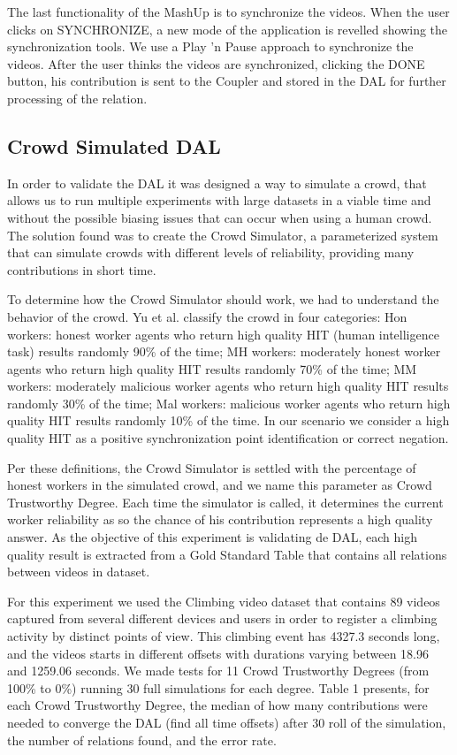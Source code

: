 \documentclass[sigconf]{acmart}
\begin{document}
The last functionality of the MashUp is to synchronize the videos. When the user clicks on SYNCHRONIZE, a new mode of the application is revelled showing the synchronization tools. We use a Play ’n Pause approach to synchronize the videos. After the user thinks the videos are synchronized, clicking the DONE button, his contribution is sent to the Coupler and stored in the DAL for further processing of the relation.

\subsection{Crowd Simulated DAL}
In order to validate the DAL it was designed a way to simulate a crowd, that allows us to run multiple experiments with large datasets in a viable time and without the possible biasing issues that can occur when using a human crowd. The solution found was to create the Crowd Simulator, a parameterized system that can simulate crowds with different levels of reliability, providing many contributions in short time.

To determine how the Crowd Simulator should work, we had to understand the behavior of the crowd. Yu et al.\cite{yu2012challenges} classify the crowd in four categories: Hon workers: honest worker agents who return high quality HIT (human intelligence task) results randomly 90\% of the time; MH workers: moderately honest worker agents who return high quality HIT results randomly 70\% of the time; MM workers: moderately malicious worker agents who return high quality HIT results randomly 30\% of the time; Mal workers: malicious worker agents who return high quality HIT results randomly 10\% of the time. In our scenario we consider a high quality HIT as a positive synchronization point identification or correct negation.

Per these definitions, the Crowd Simulator is settled with the percentage of honest workers in the simulated crowd, and we name this parameter as Crowd Trustworthy Degree. Each time the simulator is called, it determines the current worker reliability as so the chance of his contribution represents a high quality answer. As the objective of this experiment is validating de DAL, each high quality result is extracted from a Gold Standard Table that contains all relations between videos in dataset.

For this experiment we used the Climbing video dataset \cite{hal-01162603} that contains 89 videos captured from several different devices and users in order to register a climbing activity by distinct points of view. This climbing event has 4327.3 seconds long, and the videos starts in different offsets with durations varying between 18.96 and 1259.06 seconds. We made tests for 11 Crowd Trustworthy Degrees (from 100\% to 0\%) running 30 full simulations for each degree. Table 1 presents, for each Crowd Trustworthy Degree, the median of how many contributions were needed to converge the DAL (find all time offsets) after 30 roll of the simulation, the number of relations found, and the error rate.
\end{document}
